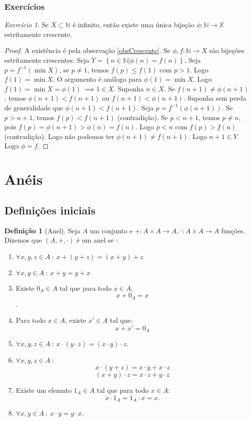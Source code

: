 \documentclass{article}
\theoremstyle{plain}
\theoremstyle{definition}
\newtheorem{definicao}{Definição}[section]
\theoremstyle{remark}
\newtheorem{exercicio}{Exercício}[subsection]
\begin{document}
\subsubsection{Exercícios}
\begin{exercicio}
	Se $X \subset \mathbb{N}$ é  infinito, então existe uma única bijeção $\phi: \mathbb{N} \to \mathbb{X}$ estritamente crescente.
\end{exercicio}
\begin{proof}
	A existência é pela observação \ref{obsCrescente}. Se $\phi,f:\mathbb{N} \to  X$ são bijeções estritamente crescentes. Seja $Y = \left\{n \in \mathbb{N} | \phi(n) = f(n)\right\}$. Seja $p = f^{-1}(\min X)$, se $p\neq 1$, temos $f(p) \leq f(1)$ com $p > 1$. Logo $f(1) = \min X$. O argumento é análogo para $\phi(1) = \min X$. Logo $f(1) = \min X = \phi(1)\ \implies 1 \in X$. Suponha $n\in X$. Se $f(n+1) \neq \phi(n+1)$, temos $\phi(n+1) < f(n+1)$ ou $f(n+1) < \phi(n+1)$. Suponha sem perda de generalidade que $\phi(n+1) < f(n+1)$. Seja $p = f^{-1}(\phi(n+1))$. Se $p > n+1$, temos $f(p) < f(n+1)$ (contradição). Se $p < n+1$, temos $p \neq n$, pois $f(p) = \phi(n+1) > \phi(n) = f(n)$. Logo $p < n$ com $f(p) > f(n)$ (contradição). Logo não podemos ter $\phi(n+1) \neq f(n+1)$. Logo $n+1\in Y$. Logo $\phi  = f$.
\end{proof}

\section{Anéis }

\subsection{Definições iniciais}
\begin{definicao}[Anel]
	Seja $A$ um conjunto e $+ : A\times A \to A$, $\cdot : A \times A \to A$ funções. Dizemos que $(A, +, \cdot) $ é um anel se :
	\begin{enumerate}
		\item  $ \forall x,y,z\in A \: : \:  x+ (y+z) = (x+y) + z $
		\item $ \forall x,y \in A \: : \:  x+ y = y+x $
		\item Existe $0_A \in A$ tal que para todo $x\in A$, $$x+0_A = x$$.
		\item Para todo $x\in A$, existe $x'\in A$ tal que:  $$ x + x' = 0_A$$
		\item  $ \forall x,y,z\in A \: : \:  x\cdot (y\cdot z) = (x\cdot y)\cdot z$.
		\item  $ \forall x,y,z\in A \: :$
			$$x\cdot (y+ z) = x\cdot y + x\cdot z$$
			$$ (x+ y) \cdot z = x\cdot z + y\cdot z$$
		\item  Existe um elemnto $1_A \in A$ tal que para todo $x\in A$: $$ x\cdot 1_A = 1_A\cdot x =  x.$$
		\item  $ \forall x,y\in A \: : \:  x\cdot y = y\cdot x$.
	\end{enumerate}
\end{definicao}
\end{document}
